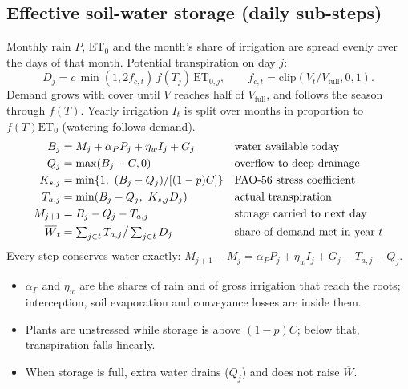 \documentclass[11pt,a4paper]{article}
\newcommand{\Wb}{\overline W}
\begin{document}
\subsection{Effective soil-water storage (daily sub-steps)}
Monthly rain $P$, ET$_0$ and the month's share of irrigation are spread evenly over the days of that month.
Potential transpiration on day $j$:
\begin{equation}\label{eq:demand}
D_j=c\,\min(1,2f_{c,t})\,f(T_j)\,\mathrm{ET}_{0,j},\qquad f_{c,t}=\mathrm{clip}(V_t/V_{\mathrm{full}},0,1).
\end{equation}
Demand grows with cover until $V$ reaches half of $V_{\mathrm{full}}$, and follows the season through $f(T)$.
Yearly irrigation $I_t$ is split over months in proportion to $f(T)\mathrm{ET}_0$ (watering follows demand).
\begin{align}
B_j&=M_j+\alpha_PP_j+\eta_wI_j+G_j &&\text{water available today}\label{eq:avail}\\
Q_j&=\max(B_j-C,0) &&\text{overflow to deep drainage}\notag\\
K_{s,j}&=\min\{1,\ (B_j-Q_j)/[(1-p)C]\} &&\text{FAO-56 stress coefficient}\notag\\
T_{a,j}&=\min(B_j-Q_j,\ K_{s,j}D_j) &&\text{actual transpiration}\notag\\
M_{j+1}&=B_j-Q_j-T_{a,j} &&\text{storage carried to next day}\label{eq:store}\\
\Wb_t&=\textstyle\sum_{j\in t}T_{a,j}\big/\sum_{j\in t}D_j &&\text{share of demand met in year }t\label{eq:wbar}
\end{align}
Every step conserves water exactly: $M_{j+1}-M_j=\alpha_PP_j+\eta_wI_j+G_j-T_{a,j}-Q_j$.
\begin{itemize}
\item $\alpha_P$ and $\eta_w$ are the shares of rain and of gross irrigation that reach the roots;
interception, soil evaporation and conveyance losses are inside them.
\item Plants are unstressed while storage is above $(1-p)C$; below that, transpiration falls linearly.
\item When storage is full, extra water drains ($Q_j$) and does not raise $\Wb$.
\end{itemize}
\end{document}
